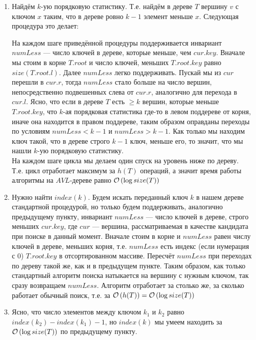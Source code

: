 \begin{enumerate}[label=(\alph*)]
	\item Найдём $k$-ую порядковую статистику. Т.е. найдём в дереве $T$ вершину $v$ с ключом $x$ таким, что в дереве ровно $k-1$ элемент меньше $x$. Следующая процедура это делает:
	\begin{algorithmic}
			\EndIf
			\EndIf
		\EndWhile
	\EndProcedure
	\end{algorithmic}
	На каждом шаге приведённой процедуры поддерживается инвариант $numLess$ --- число ключей в дереве, которые меньше, чем $cur.key$. Вначале мы стоим в корне $T.root$ и число ключей, меньших $T.root.key$ равно $size(T.root.l)$. Далее $numLess$ легко поддерживать. Пускай мы из $cur$ перешли в $cur.r$, тогда $numLess$ стало больше на число вершин, непосредственно подвешенных слева от $cur.r$, аналогично для перехода в $cur.l$. Ясно, что если в дереве $T$ есть $\geq k$ вершин, которые меньше $T.root.key$, что $k$-ая порядковая статистика где-то в левом поддереве от корня, иначе она находится в правом поддереве, таким образом оправданы переходы по условиям $numLess < k -1$ и $numLess > k-1$. Как только мы находим ключ такой, что в дереве строго $k-1$ ключ, меньше его, то значит, что мы нашли $k$-ую порядковую статистику.\\
	На каждом шаге цикла мы делаем один спуск на уровень ниже по дереву. Т.е. цикл отработает максимум за $h(T)$ операций, а значит время работы алгоритмы на $AVL$-дереве равно $\mathcal{O}\left(\log{size(T)}\right)$ \xqed

	\item Нужно найти $index(k)$. Будем искать переданный ключ $k$ в нашем дереве стандартной процедурой, но только будем поддерживать, аналогично предыдущему пункту, инвариант $numLess$ --- число ключей в дереве, строго меньших $cur.key$, где $cur$ --- вершина, рассматриваемая в качестве кандидата при поиске в данный момент. Вначале стоим в корне и $numLess$ равен числу ключей в дереве, меньших корня, т.е. $numLess$ есть индекс (если нумерация с 0) $T.root.key$ в отсортированном массиве. Пересчёт $numLess$ при переходах по дереву такой же, как и в предыдущем пункте.  Таким образом, как только стандартный алгоритм поиска натыкается на вершину с нужным ключом, так сразу возвращаем $numLess$. Алгоритм отработает за столько же, за сколько работает обычный поиск, т.е. за $\mathcal{O}\left(h(T)\right) = \mathcal{O}\left(\log{size(T)}\right)$ \xqed
	\item Ясно, что число элементов между ключом $k_1$ и $k_2$ равно $index(k_2)-index(k_1)-1$, но $index(k)$ мы умеем находить за $\mathcal{O}\left(\log{size(T)}\right)$ по предыдущему пункту. \xqed
\end{enumerate}

